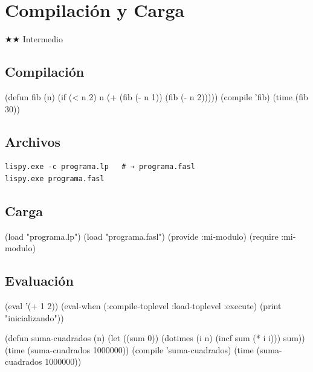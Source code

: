 \chapter{Compilación y Carga}
\label{chap:compilation}
{\huge$\bigstar$}{\huge$\bigstar$} Intermedio

\section{Compilación}
\begin{lispcode}
(defun fib (n) (if (< n 2) n (+ (fib (- n 1)) (fib (- n 2)))))
(compile 'fib)
(time (fib 30))
\end{lispcode}

\section{Archivos}
\begin{verbatim}
lispy.exe -c programa.lp   # → programa.fasl
lispy.exe programa.fasl
\end{verbatim}

\section{Carga}
\begin{lispcode}
(load "programa.lp")
(load "programa.fasl")
(provide :mi-modulo)
(require :mi-modulo)
\end{lispcode}

\section{Evaluación}
\begin{lispcode}
(eval '(+ 1 2))
(eval-when (:compile-toplevel :load-toplevel :execute) (print "inicializando"))
\end{lispcode}

\begin{examplebox}[title=Benchmark antes/después de compile]
\begin{lispcode}
(defun suma-cuadrados (n)
  (let ((sum 0)) (dotimes (i n) (incf sum (* i i))) sum))
(time (suma-cuadrados 1000000))
(compile 'suma-cuadrados)
(time (suma-cuadrados 1000000))
\end{lispcode}
\end{examplebox}

